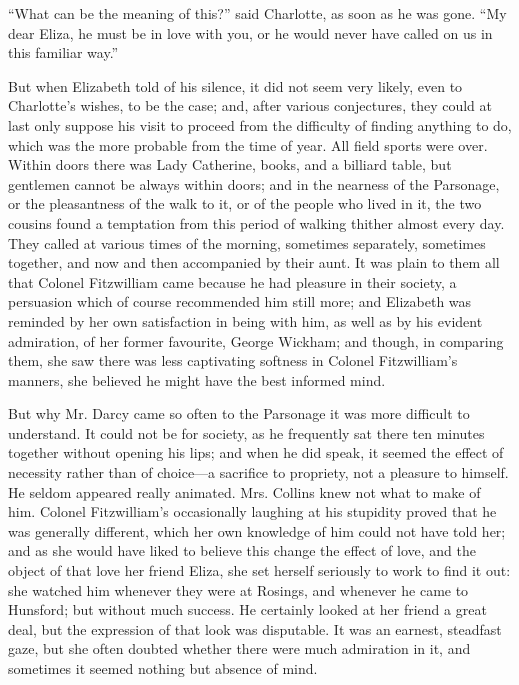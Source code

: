 ``What can be the meaning of this?'' said Charlotte, as soon as he was gone. ``My dear Eliza, he must be in love with you, or he would never have called on us in this familiar way.''

But when Elizabeth told of his silence, it did not seem very likely, even to Charlotte's wishes, to be the case; and, after various conjectures, they could at last only suppose his visit to proceed from the difficulty of finding anything to do, which was the more probable from the time of year. All field sports were over. Within doors there was Lady Catherine, books, and a billiard table, but gentlemen cannot be always within doors; and in the nearness of the Parsonage, or the pleasantness of the walk to it, or of the people who lived in it, the two cousins found a temptation from this period of walking thither almost every day. They called at various times of the morning, sometimes separately, sometimes together, and now and then accompanied by their aunt. It was plain to them all that Colonel Fitzwilliam came because he had pleasure in their society, a persuasion which of course recommended him still more; and Elizabeth was reminded by her own satisfaction in being with him, as well as by his evident admiration, of her former favourite, George Wickham; and though, in comparing them, she saw there was less captivating softness in Colonel Fitzwilliam's manners, she believed he might have the best informed mind.

But why Mr. Darcy came so often to the Parsonage it was more difficult to understand. It could not be for society, as he frequently sat there ten minutes together without opening his lips; and when he did speak, it seemed the effect of necessity rather than of choice---a sacrifice to propriety, not a pleasure to himself. He seldom appeared really animated. Mrs. Collins knew not what to make of him. Colonel Fitzwilliam's occasionally laughing at his stupidity proved that he was generally different, which her own knowledge of him could not have told her; and as she would have liked to believe this change the effect of love, and the object of that love her friend Eliza, she set herself seriously to work to find it out: she watched him whenever they were at Rosings, and whenever he came to Hunsford; but without much success. He certainly looked at her friend a great deal, but the expression of that look was disputable. It was an earnest, steadfast gaze, but she often doubted whether there were much admiration in it, and sometimes it seemed nothing but absence of mind.

